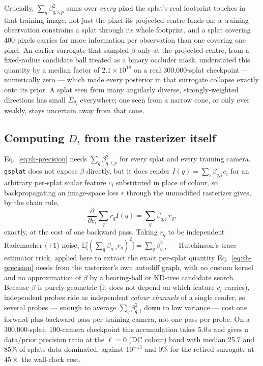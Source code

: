 \documentclass[letterpaper,10pt,conference]{ieeeconf}
\begin{document}
Crucially, $\sum_q\beta_{q,i,p}^2$ sums over \emph{every} pixel the splat's
real footprint touches in that training image, not just the pixel its
projected centre lands on: a training observation constrains a splat
through its whole footprint, and a splat covering 400 pixels carries far
more information per observation than one covering one pixel. An earlier
surrogate that sampled $\beta$ only at the projected centre, from a
fixed-radius candidate ball treated as a binary occluder mask, understated
this quantity by a median factor of $2.1\times10^{18}$ on a real
300{,}000-splat checkpoint --- numerically zero --- which made every
posterior in that surrogate collapse exactly onto its prior. A splat seen
from many angularly diverse, strongly-weighted directions has small
$\Sigma_{\theta_i}$ everywhere; one seen from a narrow cone, or only ever
weakly, stays uncertain away from that cone.

\subsection{Computing $D_i$ from the rasterizer itself}
\label{sec:rademacher}

Eq.~\eqref{eq:sh-precision} needs $\sum_q\beta_{q,i,p}^2$ for every splat
and every training camera. \texttt{gsplat} does not expose $\beta$
directly, but it does render $I(q)=\sum_i\beta_{q,i}c_i$ for an arbitrary
per-splat scalar feature $c_i$ substituted in place of colour, so
backpropagating an image-space loss $r$ through the unmodified rasterizer
gives, by the chain rule,
\begin{equation}
    \frac{\partial}{\partial c_i}\sum_q r_q I(q) = \sum_q \beta_{q,i}\,r_q,
    \label{eq:rademacher-grad}
\end{equation}
exactly, at the cost of one backward pass. Taking $r_q$ to be independent
Rademacher ($\pm1$) noise, $\mathbb E\big[(\sum_q\beta_{q,i}r_q)^2\big]
=\sum_q\beta_{q,i}^2$ --- Hutchinson's trace-estimator trick, applied here
to extract the exact per-splat quantity Eq.~\eqref{eq:sh-precision} needs
from the rasterizer's own autodiff graph, with no custom kernel and no
approximation of $\beta$ by a bearing-ball or KD-tree candidate search.
Because $\beta$ is purely geometric (it does not depend on which feature
$c_i$ carries), independent probes ride as independent \emph{colour
channels} of a single render, so several probes --- enough to average
$\sum_q\beta_{q,i}^2$ down to low variance --- cost one forward-plus-backward
pass per training camera, not one pass per probe. On a 300{,}000-splat,
100-camera checkpoint this accumulation takes 5.0\,s and gives a data/prior
precision ratio at the $\ell=0$ (DC colour) band with median 25.7 and 85\%
of splats data-dominated, against $10^{-13}$ and 0\% for the retired
surrogate at $45\times$ the wall-clock cost.
\end{document}
